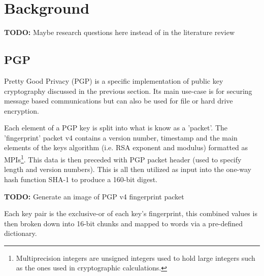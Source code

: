 \chapter{Background}
\label{cha:Background}

\textbf{TODO:} Maybe research questions here instead of in the literature review

\section{PGP}
Pretty Good Privacy (PGP) is a specific implementation of public key cryptography discussed in the previous section. Its main use-case is for securing message based communications but can also be used for file or hard drive encryption.

Each element of a PGP key is split into what is know as a 'packet'. The 'fingerprint' packet v4 contains a version number, timestamp and the main elements of the keys algorithm (i.e. RSA exponent and modulus) formatted as MPIs\footnote{Multiprecision integers are unsigned integers used to hold large integers such as the ones used in cryptographic calculations.}. This data is then preceded with PGP packet header (used to specify length and version numbers). This is all then utilized as input into the one-way hash function SHA-1 to produce a 160-bit digest.

\textbf{TODO: } Generate an image of PGP v4 fingerprint packet

Each key pair is the exclusive-or of each key's fingerprint, this combined values is then broken down into 16-bit chunks and mapped to words via a pre-defined dictionary.


